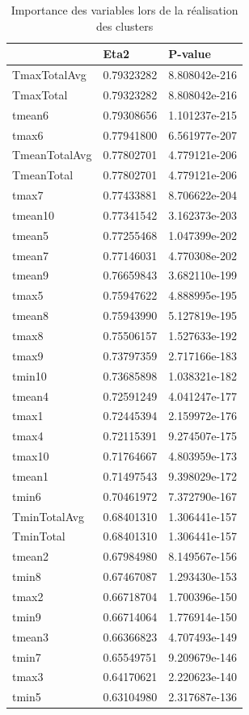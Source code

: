 \begin{table}[H]
	\centering
	\label{ClusterVarImp}
	\caption{Importance des variables lors de la réalisation des clusters}
	\begin{tabular}{lll}
		& Eta2       & P-value       \\
		\hline
		TmaxTotalAvg   & 0.79323282 & 8.808042e-216 \\
		TmaxTotal      & 0.79323282 & 8.808042e-216 \\
		tmean6         & 0.79308656 & 1.101237e-215 \\
		tmax6          & 0.77941800 & 6.561977e-207 \\
		TmeanTotalAvg  & 0.77802701 & 4.779121e-206 \\
		TmeanTotal     & 0.77802701 & 4.779121e-206 \\
		tmax7          & 0.77433881 & 8.706622e-204 \\
		tmean10        & 0.77341542 & 3.162373e-203 \\
		tmean5         & 0.77255468 & 1.047399e-202 \\
		tmean7         & 0.77146031 & 4.770308e-202 \\
		tmean9         & 0.76659843 & 3.682110e-199 \\
		tmax5          & 0.75947622 & 4.888995e-195 \\
		tmean8         & 0.75943990 & 5.127819e-195 \\
		tmax8          & 0.75506157 & 1.527633e-192 \\
		tmax9          & 0.73797359 & 2.717166e-183 \\
		tmin10         & 0.73685898 & 1.038321e-182 \\
		tmean4         & 0.72591249 & 4.041247e-177 \\
		tmax1          & 0.72445394 & 2.159972e-176 \\
		tmax4          & 0.72115391 & 9.274507e-175 \\
		tmax10         & 0.71764667 & 4.803959e-173 \\
		tmean1         & 0.71497543 & 9.398029e-172 \\
		tmin6          & 0.70461972 & 7.372790e-167 \\
		TminTotalAvg   & 0.68401310 & 1.306441e-157 \\
		TminTotal      & 0.68401310 & 1.306441e-157 \\
		tmean2         & 0.67984980 & 8.149567e-156 \\
		tmin8          & 0.67467087 & 1.293430e-153 \\
		tmax2          & 0.66718704 & 1.700396e-150 \\
		tmin9          & 0.66714064 & 1.776914e-150 \\
		tmean3         & 0.66366823 & 4.707493e-149 \\
		tmin7          & 0.65549751 & 9.209679e-146 \\
		tmax3          & 0.64170621 & 2.220623e-140 \\
		tmin5          & 0.63104980 & 2.317687e-136 \\
	\end{tabular}
\end{table}
